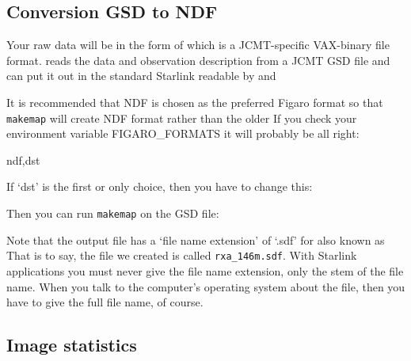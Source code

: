 \documentclass[11pt,noabs]{starlink}
\begin{document}
\subsection{\label{gsd2ndf}Conversion GSD to NDF}

   Your raw data will be in the form of
   which is a JCMT-specific VAX-binary file format.
\texttt{}
   reads the data and observation description from a JCMT GSD file and
   can put it out in the standard Starlink
   readable by
   and

   It is recommended that NDF is chosen as the preferred Figaro format
   so that \texttt{makemap} will create NDF format rather than the older
   If you check your
   environment variable FIGARO\_FORMATS it will probably be all right:

\begin{terminalv}
ndf,dst
\end{terminalv}

   If `dst' is the first or only choice, then you have to change this:

\begin{terminalv}
\end{terminalv}

   Then you can run \texttt{makemap} on the GSD file:

\begin{terminalv}
\end{terminalv}

   Note that the output file has a `file name extension' of `.sdf' for
   also known as
   That is to say, the file we created is called \texttt{rxa\_146m.sdf}.
   With Starlink applications you must never give the file name
   extension, only the stem of the file name. When you talk to the
   computer's operating system about the file, then you have to give the
   full file name, of course.

\subsection{\label{stats}Image statistics}
\end{document}
